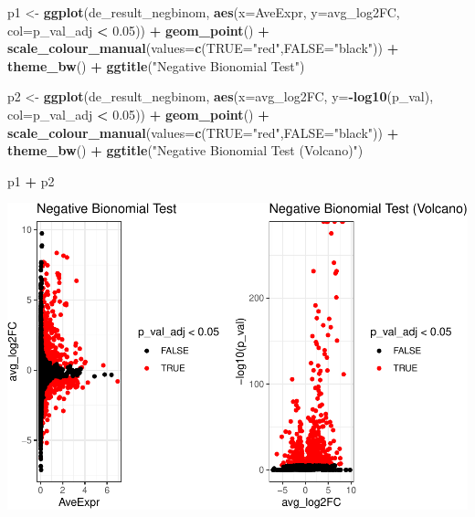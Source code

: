 \documentclass[
]{book}
\newenvironment{Shaded}{\begin{snugshade}}{\end{snugshade}}
\newcommand{\AttributeTok}[1]{\textcolor[rgb]{0.13,0.29,0.53}{#1}}
\newcommand{\FloatTok}[1]{\textcolor[rgb]{0.00,0.00,0.81}{#1}}
\newcommand{\FunctionTok}[1]{\textcolor[rgb]{0.13,0.29,0.53}{\textbf{#1}}}
\newcommand{\NormalTok}[1]{#1}
\newcommand{\OtherTok}[1]{\textcolor[rgb]{0.56,0.35,0.01}{#1}}
\newcommand{\SpecialCharTok}[1]{\textcolor[rgb]{0.81,0.36,0.00}{\textbf{#1}}}
\newcommand{\StringTok}[1]{\textcolor[rgb]{0.31,0.60,0.02}{#1}}
\begin{document}
\begin{Shaded}
\begin{Highlighting}[]
\NormalTok{p1 }\OtherTok{\textless{}{-}} \FunctionTok{ggplot}\NormalTok{(de\_result\_negbinom, }\FunctionTok{aes}\NormalTok{(}\AttributeTok{x=}\NormalTok{AveExpr, }\AttributeTok{y=}\NormalTok{avg\_log2FC, }\AttributeTok{col=}\NormalTok{p\_val\_adj }\SpecialCharTok{\textless{}} \FloatTok{0.05}\NormalTok{)) }\SpecialCharTok{+}
  \FunctionTok{geom\_point}\NormalTok{() }\SpecialCharTok{+}
  \FunctionTok{scale\_colour\_manual}\NormalTok{(}\AttributeTok{values=}\FunctionTok{c}\NormalTok{(}\StringTok{\textquotesingle{}TRUE\textquotesingle{}}\OtherTok{=}\StringTok{"red"}\NormalTok{,}\StringTok{\textquotesingle{}FALSE\textquotesingle{}}\OtherTok{=}\StringTok{"black"}\NormalTok{)) }\SpecialCharTok{+} 
  \FunctionTok{theme\_bw}\NormalTok{() }\SpecialCharTok{+}
  \FunctionTok{ggtitle}\NormalTok{(}\StringTok{"Negative Bionomial Test"}\NormalTok{)}


\NormalTok{p2 }\OtherTok{\textless{}{-}} \FunctionTok{ggplot}\NormalTok{(de\_result\_negbinom, }\FunctionTok{aes}\NormalTok{(}\AttributeTok{x=}\NormalTok{avg\_log2FC, }\AttributeTok{y=}\SpecialCharTok{{-}}\FunctionTok{log10}\NormalTok{(p\_val), }\AttributeTok{col=}\NormalTok{p\_val\_adj }\SpecialCharTok{\textless{}} \FloatTok{0.05}\NormalTok{)) }\SpecialCharTok{+}
  \FunctionTok{geom\_point}\NormalTok{() }\SpecialCharTok{+}
  \FunctionTok{scale\_colour\_manual}\NormalTok{(}\AttributeTok{values=}\FunctionTok{c}\NormalTok{(}\StringTok{\textquotesingle{}TRUE\textquotesingle{}}\OtherTok{=}\StringTok{"red"}\NormalTok{,}\StringTok{\textquotesingle{}FALSE\textquotesingle{}}\OtherTok{=}\StringTok{"black"}\NormalTok{)) }\SpecialCharTok{+} 
  \FunctionTok{theme\_bw}\NormalTok{() }\SpecialCharTok{+}
  \FunctionTok{ggtitle}\NormalTok{(}\StringTok{"Negative Bionomial Test (Volcano)"}\NormalTok{)}

\NormalTok{p1 }\SpecialCharTok{+}\NormalTok{ p2}
\end{Highlighting}
\end{Shaded}

\includegraphics{scRNAseqInR_Doco_files/figure-latex/unnamed-chunk-57-1.pdf}
\end{document}
